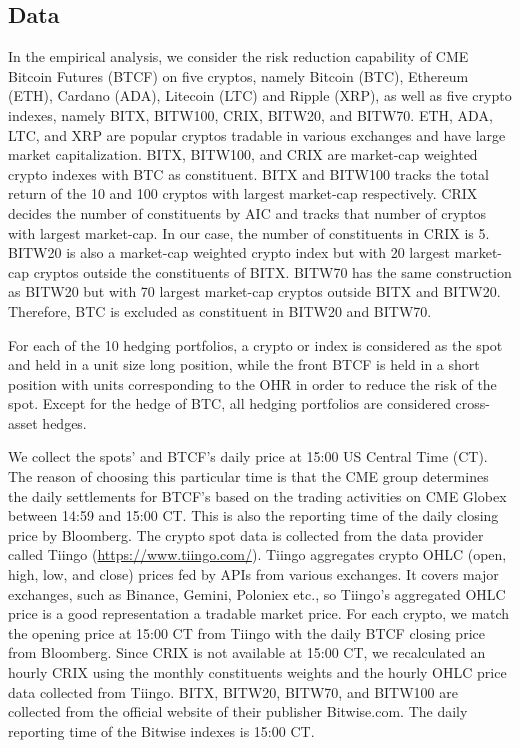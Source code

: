 \subsection{Data}\label{subsec:data}

In the empirical analysis, we consider the risk reduction capability
of CME Bitcoin Futures (BTCF) on five cryptos, namely Bitcoin (BTC), Ethereum
(ETH), Cardano (ADA), Litecoin (LTC) and Ripple (XRP), as well as five
crypto indexes, namely BITX, BITW100, CRIX, BITW20, and BITW70.
ETH, ADA, LTC, and XRP are popular cryptos tradable in various
exchanges and have large market capitalization. 
BITX, BITW100, and CRIX are market-cap weighted crypto indexes with
BTC as constituent. 
BITX and BITW100 tracks the total return of the 10 and 100 cryptos
with largest market-cap respectively. 
CRIX decides the number of constituents by AIC and tracks that number
of cryptos with largest market-cap. In our case, the number of
constituents in CRIX is 5. 
BITW20 is also a market-cap weighted crypto index but with 20 largest
market-cap cryptos outside the constituents of BITX.
BITW70 has the same construction as BITW20 but with 70 largest
market-cap cryptos outside BITX and BITW20. 
Therefore, BTC is excluded as constituent in BITW20 and BITW70. \medskip

For each of the 10 hedging portfolios, a crypto or index is considered
as the spot and held in a unit size long position, while 
the front BTCF is held in a short position with units corresponding to
the OHR in order to reduce the risk of the spot. 
Except for the hedge of BTC, all hedging portfolios are considered
cross-asset hedges. \medskip

We collect the spots' and BTCF's daily price at 15:00 US Central Time
(CT). The reason of choosing this particular time is that the CME
group determines the daily settlements for BTCF's based on the trading
activities on CME Globex between 14:59 and 15:00 CT. This is also the
reporting time of the daily closing price by Bloomberg. 
The crypto spot data is collected from the data provider called
Tiingo (\href{https://www.tiingo.com/}{https://www.tiingo.com/}).
Tiingo aggregates crypto OHLC (open, high, low, and close) prices fed
by APIs from various exchanges. It covers major exchanges, such as
Binance, Gemini, Poloniex etc., so Tiingo's aggregated OHLC price is a
good representation a tradable market price. 
For each crypto, we match the opening price at 15:00 CT from Tiingo
with the daily BTCF closing price from Bloomberg.
Since CRIX is not available at 15:00 CT, we recalculated an hourly
CRIX using the monthly constituents weights and the hourly OHLC price
data collected from Tiingo. 
BITX, BITW20, BITW70, and BITW100 are collected from the official
website of their publisher Bitwise.com. 
The daily reporting time of the Bitwise indexes is 15:00 CT.

